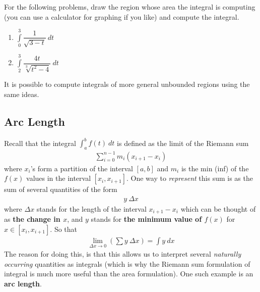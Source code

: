 \begin{exercise}
	For the following problems, draw the region whose area the integral is computing (you can use a calculator for graphing if you like) and compute the integral.
	\begin{multicols}{2}
		\begin{enumerate}
			\item $\int \limits_0^{3} \dfrac{1}{\sqrt{3 - t}} \: dt$
			\item $\int \limits_{2}^{3} \dfrac{4t}{\sqrt[3]{t^2 - 4}} \: dt$
			\end{enumerate}
	\end{multicols}
\end{exercise}

It is possible to compute integrals of more general unbounded regions using the same ideas.

\subsection{Arc Length}
Recall that the integral $\int_a^b f(t) \: dt$ is defined as the limit of the Riemann sum
\begin{align*}
  \sum_{i = 0}^{n-1} m_i (x_{i+1} - x_{i})
\end{align*}
where $x_i$'s form a partition of the interval $[a,b]$ and $m_i$ is the min (inf) of the $f(x)$ values in the interval $[x_i, x_{i+1}]$. One way to {\it represent} this sum is as the sum of several quantities of the form
\begin{align*}
  y \: \Delta x
\end{align*}
where $\Delta x$ stands for the length of the interval $x_{i+1} - x_i$ which can be thought of as {\bf the change in $x$}, and $y$ stands for {\bf the minimum value of $f(x)$} for $x \in[x_i, x_{i+1}]$. So that
\begin{align}
  \label{eq:sum_limit}
  \lim \limits_{\Delta x \rightarrow 0} \left(\sum y \: \Delta x \right) = \int y \: dx
\end{align}
The reason for doing this, is that this allows us to interpret several {\it naturally occurring} quantities as integrals (which is why the Riemann sum formulation of integral is much more useful than the area formulation). One such example is an {\bf arc length}.\\


